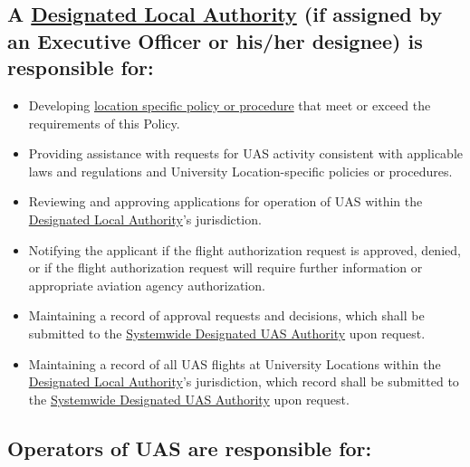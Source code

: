 \documentclass[
]{book}
\providecommand{\tightlist}{%
  \setlength{\itemsep}{0pt}\setlength{\parskip}{0pt}}
\begin{document}
\hypertarget{a-refdla-if-assigned-by-an-executive-officer-or-hisher-designee-is-responsible-for}{%
\subsection{A \protect\hyperlink{DLA}{Designated Local Authority} (if assigned by an Executive Officer or his/her designee) is responsible for:}\label{a-refdla-if-assigned-by-an-executive-officer-or-hisher-designee-is-responsible-for}}

\begin{itemize}
\tightlist
\item
  Developing \protect\hyperlink{LSP}{location specific policy or procedure} that meet or exceed the requirements of this Policy.
\item
  Providing assistance with requests for UAS activity consistent with applicable laws and regulations and University Location-specific policies or procedures.
\item
  Reviewing and approving applications for operation of UAS within the \protect\hyperlink{DLA}{Designated Local Authority}'s jurisdiction.
\item
  Notifying the applicant if the flight authorization request is approved, denied, or if the flight authorization request will require further information or appropriate aviation agency authorization.
\item
  Maintaining a record of approval requests and decisions, which shall be submitted to the \protect\hyperlink{SDA}{Systemwide Designated UAS Authority} upon request.
\item
  Maintaining a record of all UAS flights at University Locations within the \protect\hyperlink{DLA}{Designated Local Authority}'s jurisdiction, which record shall be submitted to the \protect\hyperlink{SDA}{Systemwide Designated UAS Authority} upon request.
\end{itemize}

\hypertarget{operators-of-uas-are-responsible-for}{%
\subsection{Operators of UAS are responsible for:}\label{operators-of-uas-are-responsible-for}}
\end{document}
